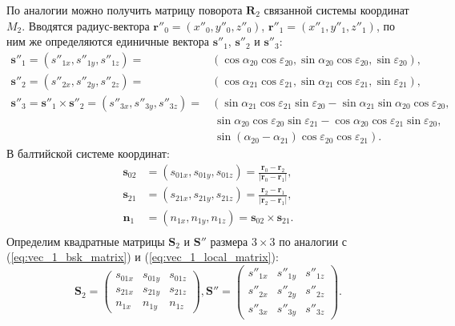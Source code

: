 \documentclass[../main.tex]{subfiles}
\begin{document}
По аналогии можно получить матрицу поворота $\mathbf{R}_2$ связанной системы
координат $M_2$. Вводятся радиус-вектора $\mathbf{r}''_0 = \left(x''_0, y''_0, z''_0\right)$,
$\mathbf{r}''_1 = \left(x''_1, y''_1, z''_1\right)$, по ним же определяются единичные вектора
$\mathbf{s}''_1$, $\mathbf{s}''_2$ и $\mathbf{s}''_3$:
\begin{equation}\label{eq:vec_2_local}
    \begin{split}
    \mathbf{s}''_1 = \left(s''_{1x}, s''_{1y}, s''_{1z}\right) =  &\left(\cos\alpha_{20} \cos\varepsilon_{20}, \sin\alpha_{20}\cos\varepsilon_{20}, \sin\varepsilon_{20}\right),\\
    \mathbf{s}''_2 = \left(s''_{2x}, s''_{2y}, s''_{2z}\right) = &\left(\cos\alpha_{21} \cos\varepsilon_{21}, \sin\alpha_{21}\cos\varepsilon_{21}, \sin\varepsilon_{21}\right),\\
    \mathbf{s}''_3 = \mathbf{s}''_1 \times \mathbf{s}''_2 = \left(s''_{3x}, s''_{3y}, s''_{3z}\right) =  &\left(\sin\alpha_{21}\cos\varepsilon_{21}\sin\varepsilon_{20} - \sin\alpha_{21}\sin\alpha_{20}\cos\varepsilon_{20},\right.\\
    &\ \sin\alpha_{20}\cos\varepsilon_{20}\sin\varepsilon_{21} - \cos\alpha_{20}\cos\varepsilon_{21}\sin\varepsilon_{20},\\
    &\ \left.\sin\left(\alpha_{20} - \alpha_{21}\right)\cos\varepsilon_{20}\cos\varepsilon_{21}\right).
    \end{split}
\end{equation}
В балтийской системе координат:
\begin{equation}\label{eq:vec_2_bsk}
    \begin{split}
        \mathbf{s}_{02} &= \left(s_{01x}, s_{01y}, s_{01z}\right) = \frac{\mathbf{r}_0 - \mathbf{r}_2}{|\mathbf{r}_0 - \mathbf{r}_1|},\\
        \mathbf{s}_{21} &= \left(s_{21x}, s_{21y}, s_{21z}\right) = \frac{\mathbf{r}_2 - \mathbf{r}_1}{|\mathbf{r}_2 - \mathbf{r}_1|},\\
        \mathbf{n}_1 &= \left(n_{1x}, n_{1y}, n_{1z}\right) = \mathbf{s}_{02} \times \mathbf{s}_{21}.\\
    \end{split}
\end{equation}
Определим квадратные матрицы $\mathbf{S}_2$ и $\mathbf{S}''$ размера $3 \times 3$ по аналогии с (\ref{eq:vec_1_bsk_matrix}) и (\ref{eq:vec_1_local_matrix}):
\begin{equation}\label{eq:vec_1_bsk_matrix}
    \mathbf{S}_2 =
    \left(
        \begin{matrix}
            s_{01x} & s_{01y} & s_{01z} \\
            s_{21x} & s_{21y} & s_{21z} \\
            n_{1x} & n_{1y} & n_{1z}
        \end{matrix}
    \right),
    \mathbf{S}'' =
    \left(
        \begin{matrix}
            s''_{1x} & s''_{1y} & s''_{1z} \\
            s''_{2x} & s''_{2y} & s''_{2z} \\
            s''_{3x} & s''_{3y} & s''_{3z}
        \end{matrix}
    \right).
\end{equation}
\end{document}
